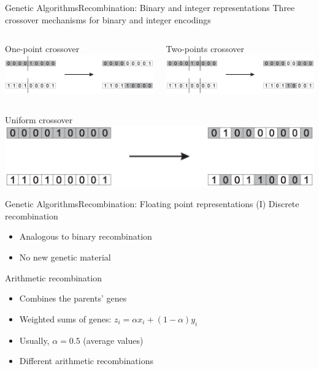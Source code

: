 \documentclass[10pt,compress]{beamer} %
\begin{document}
\begin{frame}{Genetic Algorithms}{Recombination: Binary and integer representations}
	Three crossover mechanisms for binary and integer encodings
    \begin{columns}
		\begin{center}
		One-point crossover\\
		\includegraphics[width=\linewidth]{figs/onepoint.eps}\\
		\end{center}
		\begin{center}
		Two-points crossover\\
		\includegraphics[width=\linewidth]{figs/npoint.eps}\\
		\end{center}
	   \end{columns}

	\begin{center}
		\centering Uniform crossover\\
		\includegraphics[width=0.5\linewidth]{figs/uniform-xover.eps}
	\end{center}

\end{frame}

\begin{frame}{Genetic Algorithms}{Recombination: Floating point representations (I)}
	Discrete recombination
	\begin{itemize}
		\item Analogous to binary recombination
		\item No new genetic material
	\end{itemize}
	Arithmetic recombination
	\begin{itemize}
		\item Combines the parents' genes
		\item Weighted sums of genes: $z_i=\alpha x_i + (1-\alpha) y_i$
		\item Usually, $\alpha=0.5$ (average values)
		\item Different arithmetic recombinations
	\end{itemize}
\end{frame}
\end{document}
